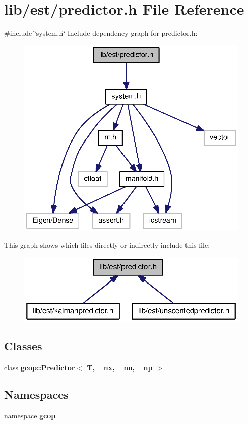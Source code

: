 \section{lib/est/predictor.h \-File \-Reference}
\label{predictor_8h}
{\ttfamily \#include \char`\"{}system.\-h\char`\"{}}\*
\-Include dependency graph for predictor.\-h\-:
\nopagebreak
\begin{figure}[H]
\begin{center}
\leavevmode
\includegraphics[width=336pt]{predictor_8h__incl}
\end{center}
\end{figure}
\-This graph shows which files directly or indirectly include this file\-:
\nopagebreak
\begin{figure}[H]
\begin{center}
\leavevmode
\includegraphics[width=320pt]{predictor_8h__dep__incl}
\end{center}
\end{figure}
\subsection*{\-Classes}
\begin{DoxyCompactItemize}
\item 
class {\bf gcop\-::\-Predictor$<$ T, \-\_\-nx, \-\_\-nu, \-\_\-np $>$}
\end{DoxyCompactItemize}
\subsection*{\-Namespaces}
\begin{DoxyCompactItemize}
\item 
namespace {\bf gcop}
\end{DoxyCompactItemize}
